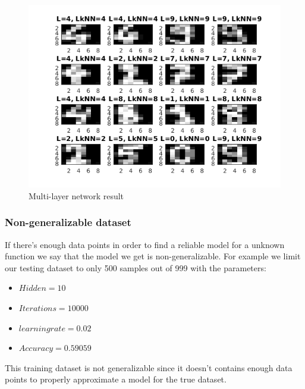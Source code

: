 \documentclass[a4paper,12pt]{article}
\begin{document}
\begin{figure}[H]
\centering
  \begin{minipage}[]{1\textwidth}
  \caption{Multi-layer network result}\label{fig:multi_4_test}
  \includegraphics[width=\textwidth]{figures/multi_4_test.png}
  \end{minipage}
\end{figure}

\subsubsection{Non-generalizable dataset}

If there's enough data points in order to find a reliable model for a unknown function we say that the model we get is non-generalizable. For example we limit our testing dataset to only 500 samples out of 999 with the parameters:

\begin{itemize}
\item $Hidden = 10$
\item $Iterations = 10000$
\item $learning rate = 0.02$
\item $Accuracy = 0.59059$
\end{itemize}

This training dataset is not generalizable since it doesn't contains enough data points to properly approximate a model for the true dataset. 
\end{document}
